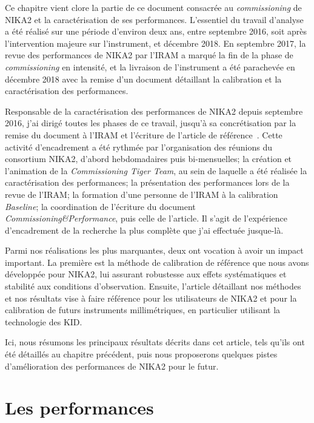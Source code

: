 
Ce chapitre vient clore la partie de ce document consacrée au
\emph{commissioning} de NIKA2 et la caractérisation de ses
performances.
L'essentiel du travail d'analyse a été réalisé sur une période
d'environ deux ans, entre septembre 2016, soit après l'intervention
majeure sur l'instrument, et décembre 2018. En septembre 2017, la
revue des performances de NIKA2 par l'IRAM a
marqué la fin de la phase de \emph{commissioning} en intensité, et la
livraison de l'instrument a été parachevée en décembre 2018 avec la
remise d'un document détaillant la calibration et la caractérisation des
performances.

Responsable de la caractérisation des performances de NIKA2 depuis
septembre 2016, j'ai dirigé toutes les phases de ce travail, jusqu'à
sa concrétisation par la remise du document à l'IRAM et l'écriture de
l'article de référence~\citep{Perotto2019}. Cette activité
d'encadrement a été rythmée par l'organisation des réunions du
consortium NIKA2, d'abord hebdomadaires puis bi-mensuelles; la création et
l'animation de la \emph{Commissioning Tiger Team}, au sein de laquelle
a été réalisée la caractérisation des performances; la présentation
des performances lors de la revue de l'IRAM; la formation d'une
personne de l'IRAM à la calibration \emph{Baseline}; la coordination
de l'écriture du document \emph{Commissioning\&Performance}, puis celle
de l'article. Il s'agit de l'expérience d'encadrement de la recherche
la plus complète que j'ai effectuée jusque-là.    

Parmi nos réalisations les plus marquantes, deux ont vocation à avoir
un impact important. La première est la méthode de calibration de
référence que nous avons développée pour NIKA2, lui assurant
robustesse aux effets systématiques et stabilité aux conditions
d'observation. Ensuite, l'article détaillant nos méthodes et nos
résultats vise à faire référence pour les utilisateurs de NIKA2 et
pour la calibration de futurs instruments millimétriques, en
particulier utilisant la technologie des KID.

Ici, nous résumons les principaux résultats décrits dans cet article,
tels qu'ils ont été détaillés au chapitre précédent, puis nous
proposerons quelques pistes d'amélioration des performances de
NIKA2 pour le futur.  


\section{Les performances}

